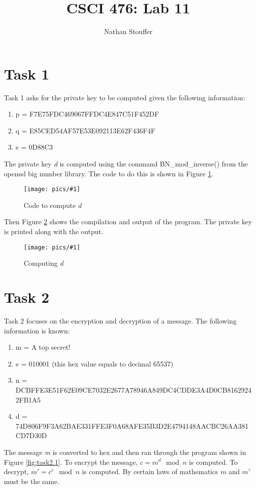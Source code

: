\documentclass[11pt]{article}
\newcommand{\fig}[2]{ 
\begin{figure}[h]
	\centering
	\caption{#2}
	\texttt{[image: pics/\#1]}
	\label{fig:#1}
\end{figure} 
}
\begin{document}
\title{CSCI 476: Lab 11}
\author{Nathan Stouffer}
\maketitle
\newpage

\newpage
\section*{Task 1}

Task 1 asks for the private key to be computed given the following information:
\begin{enumerate}
	\item p = F7E75FDC469067FFDC4E847C51F452DF
	\item q = E85CED54AF57E53E092113E62F436F4F
	\item e = 0D88C3
\end{enumerate}
The private key \textit{d} is computed using the command BN\_mod\_inverse() from the openssl big number library. The code to do this is shown in Figure \ref{fig:task1.1}.

\fig{task1.1}{Code to compute \textit{d}}

Then Figure \ref{fig:task1.2} shows the compilation and output of the program. The private key is printed along with the output.

\fig{task1.2}{Computing \textit{d}}

\newpage
\section*{Task 2}

Task 2 focuses on the encryption and decryption of a message. The following information is known:
\begin{enumerate}
	\item m = A top secret!
	\item e = 010001 (this hex value equals to decimal 65537)
	\item n = DCBFFE3E51F62E09CE7032E2677A78946A849DC4CDDE3A4D0CB81629242FB1A5
	\item d = 74D806F9F3A62BAE331FFE3F0A68AFE35B3D2E4794148AACBC26AA381CD7D30D
\end{enumerate}
The message \textit{m} is converted to hex and then ran through the program shown in Figure \ref{fig:task2.1}. To encrypt the message, $c = m^d \mod n$ is computed. To decrypt, $m' = c^e \mod n$ is computed. By certain laws of mathematics $m$ and $m'$ must be the same.
\end{document}

